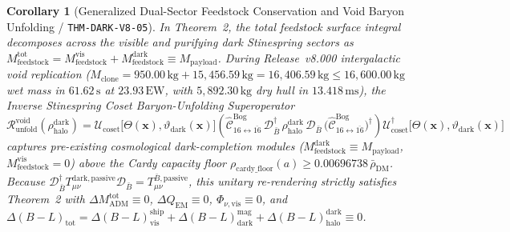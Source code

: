 \documentclass[11pt,onecolumn]{article}
\newtheorem{corollary}[theorem]{Corollary}
\begin{document}
\begin{corollary}[Generalized Dual-Sector Feedstock Conservation and Void Baryon Unfolding / \texttt{THM-DARK-V8-05}]
\label{cor:void_unfolding_reconciliation}
In Theorem~2, the total feedstock surface integral decomposes across the visible and purifying dark Stinespring sectors as $M_{\mathrm{feedstock}}^{\mathrm{tot}} = M_{\mathrm{feedstock}}^{\mathrm{vis}} + M_{\mathrm{feedstock}}^{\mathrm{dark}} \equiv M_{\mathrm{payload}}$. During Release~v8.000 intergalactic void replication ($M_{\mathrm{clone}} = 950.00\,\mathrm{kg} + 15,456.59\,\mathrm{kg} = 16,406.59\,\mathrm{kg} \le 16,600.00\,\mathrm{kg}$ wet mass in $61.62\,\mathrm{s}$ at $23.93\,\mathrm{EW}$, with $5,892.30\,\mathrm{kg}$ dry hull in $13.418\,\mathrm{ms}$), the Inverse Stinespring Coset Baryon-Unfolding Superoperator
\begin{equation}
\mathcal{R}_{\mathrm{unfold}}^{\mathrm{void}}\!\left(\rho_{\mathrm{halo}}^{\mathrm{dark}}\right) = \mathcal{U}_{\mathrm{coset}}\big[\Theta(\mathbf{x}),\vartheta_{\mathrm{dark}}(\mathbf{x})\big]\!\left(\hat{\mathcal{C}}_{16\leftrightarrow\overline{16}}^{\mathrm{Bog}}\,\mathcal{D}_{\bar{B}}^\dagger\,\rho_{\mathrm{halo}}^{\mathrm{dark}}\,\mathcal{D}_{\bar{B}}\,\big(\hat{\mathcal{C}}_{16\leftrightarrow\overline{16}}^{\mathrm{Bog}}\big)^\dagger\right)\mathcal{U}_{\mathrm{coset}}^\dagger\big[\Theta(\mathbf{x}),\vartheta_{\mathrm{dark}}(\mathbf{x})\big]
\end{equation}
captures pre-existing cosmological dark-completion modules ($M_{\mathrm{feedstock}}^{\mathrm{dark}} \equiv M_{\mathrm{payload}}$, $M_{\mathrm{feedstock}}^{\mathrm{vis}} = 0$) above the Cardy capacity floor $\rho_{\mathrm{cardy\_floor}}(a) \ge 0.00696738\,\bar{\rho}_{\mathrm{DM}}$. Because $\mathcal{D}_{\bar{B}}^\dagger T_{\mu\nu}^{\mathrm{dark,passive}}\mathcal{D}_{\bar{B}} = T_{\mu\nu}^{\bar{B},\mathrm{passive}}$, this unitary re-rendering strictly satisfies Theorem~2 with $\Delta M_{\mathrm{ADM}}^{\mathrm{tot}} \equiv 0$, $\Delta Q_{\mathrm{EM}} \equiv 0$, $\Phi_{\nu,\mathrm{vis}} \equiv 0$, and $\Delta(B-L)_{\mathrm{tot}} = \Delta(B-L)_{\mathrm{vis}}^{\mathrm{ship}} + \Delta(B-L)_{\mathrm{dark}}^{\mathrm{mag}} + \Delta(B-L)_{\mathrm{halo}}^{\mathrm{dark}} \equiv 0$.
\end{corollary}


\FloatBarrier
\end{document}
